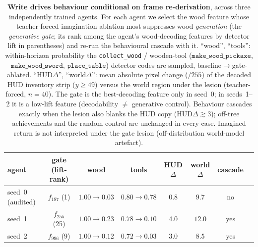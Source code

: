 \documentclass[11pt]{article}
\newcommand{\achname}[1]{\texttt{#1}}
\begin{document}
\begin{table}[t]
\centering
\caption{\textbf{Write drives behaviour conditional on frame re-derivation}, across three independently trained agents. For each agent we select the wood feature whose teacher-forced imagination ablation most suppresses wood \emph{generation} (the \emph{generative gate}; its rank among the agent's wood-decoding features by detector lift in parentheses) and re-run the behavioural cascade with it. ``wood'', ``tools'': within-horizon probability the \achname{collect\_wood} / wooden-tool ($\achname{make\_wood\_pickaxe}$, $\achname{make\_wood\_sword}$, $\achname{place\_table}$) detector codes are sampled, baseline$\to$gate-ablated. ``HUD$\Delta$'', ``world$\Delta$'': mean absolute pixel change ($/255$) of the decoded HUD inventory strip ($y\ge49$) versus the world region under the lesion (teacher-forced, $n{=}40$). The gate is the best-decoding feature only in seed~0; in seeds~1--2 it is a low-lift feature (decodability $\ne$ generative control). Behaviour cascades exactly when the lesion also blanks the HUD copy (HUD$\Delta\gtrsim3$); off-tree achievements and the random control are unchanged in every case. Imagined return is not interpreted under the gate lesion (off-distribution world-model artefact).}\label{stab:gate}
\begin{tabular}{lccccccc}
\toprule
agent & gate (lift-rank) & wood & tools & HUD$\Delta$ & world$\Delta$ & cascade \\
\midrule
seed~0 (audited) & $f_{187}$ (1) & $1.00\!\to\!0.03$ & $0.80\!\to\!0.78$ & $0.8$ & $9.7$ & no \\
seed~1 & $f_{255}$ (25) & $1.00\!\to\!0.23$ & $0.78\!\to\!0.10$ & $4.0$ & $12.0$ & yes \\
seed~2 & $f_{996}$ (9) & $1.00\!\to\!0.12$ & $0.72\!\to\!0.03$ & $3.0$ & $8.5$ & yes \\
\bottomrule
\end{tabular}
\end{table}
\end{document}
